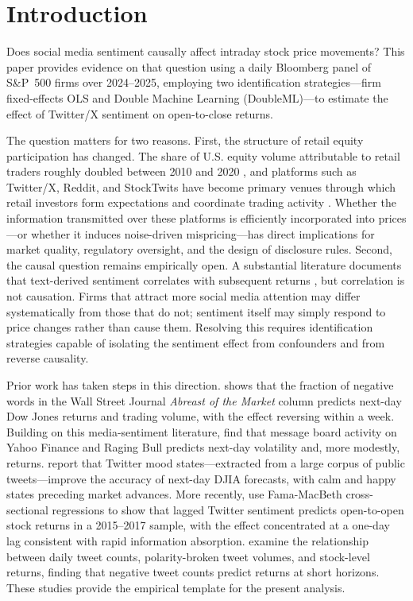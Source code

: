 
\section{Introduction}
\label{sec:introduction}

Does social media sentiment causally affect intraday stock price movements? This paper provides
evidence on that question using a daily Bloomberg panel of S\&P~500 firms over 2024--2025,
employing two identification strategies---firm fixed-effects OLS and Double Machine Learning
(DoubleML)---to estimate the effect of Twitter/X sentiment on open-to-close returns.

The question matters for two reasons. First, the structure of retail equity participation has
changed. The share of U.S. equity volume attributable to retail traders roughly doubled between
2010 and 2020 \citep{welch2022}, and platforms such as Twitter/X, Reddit, and StockTwits have
become primary venues through which retail investors form expectations and coordinate trading
activity \citep{cookson2023}. Whether the information transmitted over these platforms is
efficiently incorporated into prices---or whether it induces noise-driven mispricing---has direct
implications for market quality, regulatory oversight, and the design of disclosure rules. Second,
the causal question remains empirically open. A substantial literature documents that
text-derived sentiment correlates with subsequent returns \citep{tetlock2007, bollen2011,
antweiler2004}, but correlation is not causation. Firms that attract more social media attention
may differ systematically from those that do not; sentiment itself may simply respond to price
changes rather than cause them. Resolving this requires identification strategies capable of
isolating the sentiment effect from confounders and from reverse causality.

Prior work has taken steps in this direction. \citet{tetlock2007} shows that the fraction of
negative words in the Wall Street Journal \textit{Abreast of the Market} column predicts
next-day Dow Jones returns and trading volume, with the effect reversing within a week. Building
on this media-sentiment literature, \citet{antweiler2004} find that message board activity on
Yahoo Finance and Raging Bull predicts next-day volatility and, more modestly, returns.
\citet{bollen2011} report that Twitter mood states---extracted from a large corpus of public
tweets---improve the accuracy of next-day DJIA forecasts, with calm and happy states preceding
market advances. More recently, \citet{gu2020} use Fama-MacBeth cross-sectional regressions to
show that lagged Twitter sentiment predicts open-to-open stock returns in a 2015--2017 sample,
with the effect concentrated at a one-day lag consistent with rapid information absorption.
\citet{teti2019} examine the relationship between daily tweet counts, polarity-broken tweet
volumes, and stock-level returns, finding that negative tweet counts predict returns at short
horizons. These studies provide the empirical template for the present analysis.

